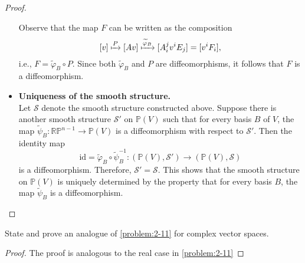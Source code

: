 \begin{problem}
\begin{proof}
\begin{itemize}
            Observe that the map $F$ can be written as the composition
            \[
                [v] \xmapsto{P} [Av] \xmapsto{\widetilde{\varphi}_B} [A^j_i v^i E_j] = [v^i F_i],
            \]
            i.e., $F = \widetilde{\varphi}_B \circ P$. Since both $\widetilde{\varphi}_B$ and $P$ are diffeomorphisms, it follows that $F$ is a diffeomorphism.            
            \item \textbf{Uniqueness of the smooth structure.}\\
            Let $\mathcal{S}$ denote the smooth structure constructed above. Suppose there is another smooth structure $\mathcal{S}'$ on $\mathbb{P}(V)$ such that for every basis $B$ of $V$, the map $\widetilde{\psi}_B \colon \mathbb{RP}^{n-1} \to \mathbb{P}(V)$ is a diffeomorphism with respect to $\mathcal{S}'$. Then the identity map
            \[
                \mathrm{id} = \widetilde{\varphi}_B \circ \widetilde{\psi}_B^{-1} \colon (\mathbb{P}(V), \mathcal{S}') \to (\mathbb{P}(V), \mathcal{S})
            \]
            is a diffeomorphism. Therefore, $\mathcal{S}' = \mathcal{S}$. This shows that the smooth structure on $\mathbb{P}(V)$ is uniquely determined by the property that for every basis $B$, the map $\widetilde{\psi}_B$ is a diffeomorphism.
        \end{itemize}
    \end{proof}
\end{problem}

\begin{problem}
    State and prove an analogue of \cref{problem:2-11} for complex vector spaces.
    \begin{proof}
        The proof is analogous to the real case in \cref{problem:2-11}
    \end{proof}
\end{problem}

